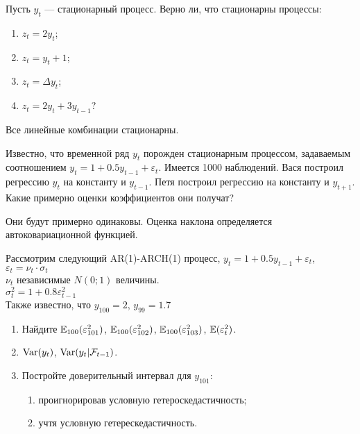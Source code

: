 \begin{problem}
Пусть $y_{t}$ — стационарный процесс. Верно ли, что стационарны процессы:
\begin{enumerate}
\item $z_{t}=2y_{t}$;
\item $z_{t}=y_{t}+1$;
\item $z_{t}=\Delta y_{t}$;
\item $z_{t}=2y_{t}+3y_{t-1}$?
\end{enumerate}


\begin{sol}
Все линейные комбинации стационарны.
\end{sol}
\end{problem}






\begin{problem}
Известно, что временной ряд $y_{t}$ порожден стационарным процессом, задаваемым соотношением $y_{t}=1+0.5y_{t-1}+\varepsilon_{t}$. Имеется 1000 наблюдений. Вася построил регрессию $y_{t}$ на константу и $y_{t-1}$. Петя построил регрессию на константу и $y_{t+1}$. Какие примерно оценки коэффициентов они получат?


\begin{sol}
Они будут примерно одинаковы. Оценка наклона определяется автоковариационной функцией.
\end{sol}
\end{problem}





\begin{problem}
Рассмотрим следующий AR(1)-ARCH(1) процесс,
$y_{t}=1+0.5y_{t-1}+\varepsilon_{t}$, $\varepsilon_{t}=\nu_{t}\cdot \sigma_{t}$ \\
$\nu_{t}$ независимые $N(0;1)$ величины. \\
$\sigma^{2}_{t}=1+0.8\varepsilon^{2}_{t-1}$\\
Также известно, что $y_{100}=2$, $y_{99}=1.7$
\begin{enumerate}
\item Найдите $\mathbb{E}_{100}(\varepsilon^{2}_{101})$, $\mathbb{E}_{100}(\varepsilon^{2}_{102})$, $\mathbb{E}_{100}(\varepsilon^{2}_{103})$, $\mathbb{E}(\varepsilon^{2}_{t})$.
\item $\operatorname{Var}(y_{t})$, $\operatorname{Var}(y_{t}|\mathcal{F}_{t-1})$.
\item Постройте доверительный интервал для $y_{101}$:
\begin{enumerate}
\item проигнорировав условную гетероскедастичность;
\item учтя условную гетерескедастичность.
\end{enumerate}
\end{enumerate}


\begin{sol}
\end{sol}
\end{problem}



